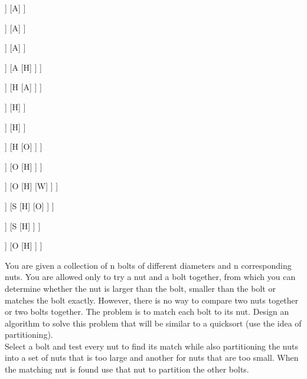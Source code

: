 \documentclass[12pt,largemargins]{homework}
\begin{document}
\begin{center}
\begin{forest}
	[Y
		[I
			[E]
		]
		[A]
	]
\end{forest}
\begin{forest}
	[Y
		[I
			[E]
			[S]
		]
		[A]
	]
\end{forest}
\begin{forest}
	[Y
		[S
			[E]
			[I]
		]
		[A]
	]
\end{forest}
\begin{forest}
	[Y
		[S
			[E]
			[I]
		]
		[A
			[H]
		]
	]
\end{forest}
\begin{forest}
	[Y
		[S
			[E]
			[I]
		]
		[H
			[A]
		]
	]
\end{forest}
\begin{forest}
	[A
		[S
			[E]
			[I]
		]
		[H]
	]
\end{forest}
\begin{forest}
	[S
		[I
			[E]
			[A]
		]
		[H]
	]
\end{forest}
\begin{forest}
	[S
		[I
			[E]
			[A]
		]
		[H
			[O]
		]
	]
\end{forest}
\begin{forest}
	[S
		[I
			[E]
			[A]
		]
		[O
			[H]
		]
	]
\end{forest}
\begin{forest}
	[S
		[I
			[E]
			[A]
		]
		[O
			[H]
			[W]
		]
	]
\end{forest}
\begin{forest}
	[W
		[I
			[E]
			[A]
		]
		[S
			[H]
			[O]
		]
	]
\end{forest}
\begin{forest}
	[O
		[I
			[E]
			[A]
		]
		[S
			[H]
		]
	]
\end{forest}
\begin{forest}
	[S
		[I
			[E]
			[A]
		]
		[O
			[H]
		]
	]
\end{forest}
\end{center}
\question
You are given a collection of n bolts of different diameters and n corresponding nuts. You are allowed only to try a nut and a bolt together, from which you can determine whether the nut is larger than the bolt, smaller than the bolt or matches the bolt exactly. However, there is no way to compare two nuts together or two bolts together. The problem is to match each bolt to its nut. Design an algorithm to solve this problem that will be similar to a quicksort (use the idea of partitioning).\\ 
Select a bolt and test every nut to find its match while also partitioning the nuts into a set of nuts that is too large and another for nuts that are too small. When the matching nut is found use that nut to partition the other bolts.\\
\end{document}
